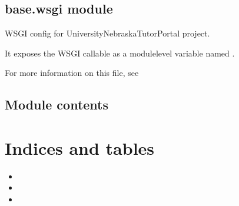\documentclass[letterpaper,10pt,english]{sphinxmanual}
\begin{document}
\section{base.wsgi module}
\label{\detokenize{settings/settings:module-base.wsgi}}\label{\detokenize{settings/settings:base-wsgi-module}}
\sphinxAtStartPar
WSGI config for University\sphinxhyphen{}Nebraska\sphinxhyphen{}Tutor\sphinxhyphen{}Portal project.

\sphinxAtStartPar
It exposes the WSGI callable as a module\sphinxhyphen{}level variable named .

\sphinxAtStartPar
For more information on this file, see


\section{Module contents}
\label{\detokenize{settings/settings:module-base}}\label{\detokenize{settings/settings:module-contents}}

\chapter{Indices and tables}
\label{\detokenize{index:indices-and-tables}}\begin{itemize}
\item {} 
\sphinxAtStartPar
{}

\item {} 
\sphinxAtStartPar
{}

\item {} 
\sphinxAtStartPar
{}

\end{itemize}
\end{document}
